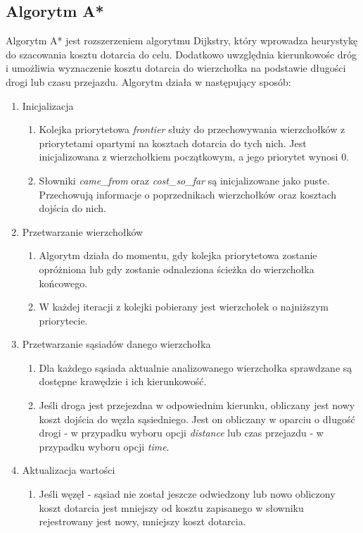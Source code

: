 \documentclass{article}
\begin{document}
\subsection{Algorytm A*}
Algorytm A* jest rozszerzeniem algorytmu Dijkstry, który wprowadza heurystykę do szacowania kosztu dotarcia do celu. Dodatkowo uwzględnia kierunkowośc dróg i umożliwia wyznaczenie kosztu dotarcia do wierzchołka na podstawie długości drogi lub czasu przejazdu.
Algorytm działa w następujący sposób:
\begin{enumerate}
    \item Inicjalizacja 
    \begin{enumerate}
        \item Kolejka priorytetowa \textit{frontier} służy do przechowywania wierzchołków z priorytetami opartymi na kosztach dotarcia do tych nich. Jest inicjalizowana z wierzchołkiem początkowym, a jego priorytet wynosi 0.
        \item Słowniki \textit{came\_from} oraz \textit{cost\_so\_far} są inicjalizowane jako puste. Przechowują informacje o poprzednikach wierzchołków oraz kosztach dojścia do nich.
    \end{enumerate}
    \item Przetwarzanie wierzchołków
    \begin{enumerate}
        \item Algorytm działa do momentu, gdy kolejka priorytetowa zostanie opróżniona lub gdy zostanie odnaleziona ścieżka do wierzchołka końcowego.
        \item W każdej iteracji z kolejki pobierany jest wierzchołek o najniższym priorytecie.
    \end{enumerate}
    \item Przetwarzanie sąsiadów danego wierzchołka
    \begin{enumerate}
        \item Dla każdego sąsiada aktualnie analizowanego wierzchołka sprawdzane są dostępne krawędzie i ich kierunkowość.
        \item Jeśli droga jest przejezdna w odpowiednim kierunku, obliczany jest nowy koszt dojścia do węzła sąsiedniego.
        Jest on obliczany w oparciu o długość drogi - w przypadku wyboru opcji \textit{distance} lub czas przejazdu - w przypadku wyboru opcji \textit{time}.
    \end{enumerate}
    \item Aktualizacja wartości
    \begin{enumerate}
        \item Jeśli węzęł - sąsiad nie został jeszcze odwiedzony lub nowo obliczony koszt dotarcia jest mniejszy od kosztu zapisanego w słowniku rejestrowany jest nowy, mniejszy koszt dotarcia.

\end{enumerate}
\end{enumerate}
\end{document}
